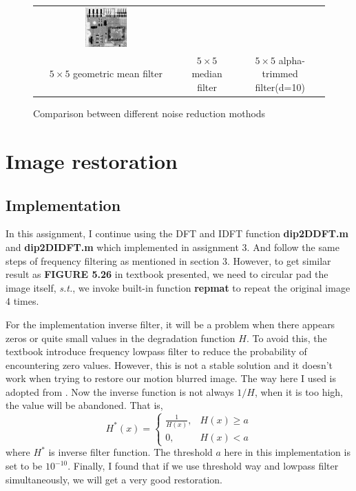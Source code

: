 \documentclass[11pt,a4paper]{article}
\begin{document}
\begin{figure}[!htbp]
\begin{tabular}{ccc}
		\includegraphics[width=0.3\textwidth]{pro4/5_12_f} \\
		$5\times 5$ geometric mean filter &  $5\times 5$ median filter & $5\times 5$ alpha-trimmed filter(d=10)
	\end{tabular}
	\caption{Comparison between different noise reduction mothods}
	\label{pro4_fig3}
\end{figure}

\newpage
\section{Image restoration}
\subsection{Implementation}
In this assignment, I continue using the DFT and IDFT function \textbf{dip2DDFT.m} and 
\textbf{dip2DIDFT.m} which implemented in assignment 3. And follow the same steps
of frequency filtering as mentioned in section 3.
However, to get similar result as \textbf{FIGURE 5.26} in textbook presented, we need to circular pad 
the image itself, \emph{s.t.}, we invoke built-in function \textbf{repmat} to repeat 
the original image 4 times. 

For the implementation inverse filter, it will be a problem when there appears zeros
or quite small values in the degradation function $H$. To avoid this, the textbook introduce
frequency lowpass filter to reduce
the probability of encountering zero values. However, this is not a stable solution and it doesn't 
work when trying to restore our motion blurred image.
The way here I used is adopted from \cite{inversef}. Now the inverse function is not
always $1/H$, when it is too high, the value will be abandoned. That is,
\begin{equation}
	H^*(x)=\left\{\begin{array}{ll}\frac{1}{H(x)},&H(x)\geq a\\
	0,&H(x)<a\end{array}\right.
\end{equation}
where $H^*$ is inverse filter function. The threshold $a$ here in this implementation is set to be $10^{-10}$.
Finally, I found that if we use threshold way and lowpass filter simultaneously,
we will get a very good restoration.
\end{document}
